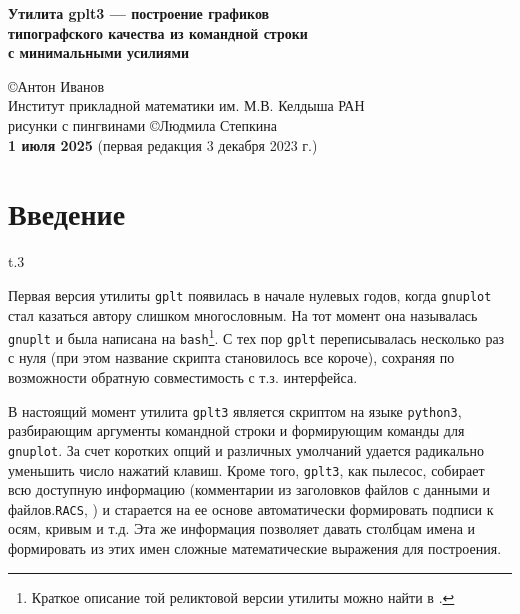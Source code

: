 \documentclass[12pt]{article}
\def\gplt{{\tt gplt}}
\def\gnuplot{{\tt gnuplot}}
\def\python{{\tt python3}}
\def\RACS{{\tt RACS}}
\begin{document}
\begin{center}
 { \Large\bf
Утилита gplt3 --- построение графиков\\ типографского качества из командной строки\\ с минимальными усилиями\\[5mm]
}

\large
\copyright Антон Иванов\\[2mm] 
\normalsize
Институт прикладной математики им. М.В. Келдыша РАН\\[2mm]

\small рисунки с пингвинами \copyright Людмила Степкина\\[3mm]
{\bf 1 июля 2025} (первая редакция 3 декабря 2023 г.)\\[7mm]

\end{center}

\vspace{-2cm}

\tableofcontents

\newpage
\section{Введение}
\begin{wrapfigure}[5]{t}{.3\textwidth}
  \vphantom{.}
  \vspace{-1.5cm}

\end{wrapfigure}
Первая версия утилиты \gplt{} появилась в начале нулевых годов, когда \gnuplot{} стал казаться автору слишком многословным.
На тот момент она называлась \verb'gnuplt' и была написана на \verb'bash'\footnote{Краткое описание той реликтовой версии утилиты можно найти в \cite{aiv:racs2007}.}.
С тех пор \gplt{} переписывалась несколько раз с нуля (при этом название скрипта становилось все короче),
сохраняя по возможности обратную совместимость с т.з. интерфейса.  

\def\gplt{{\tt gplt3}}

В настоящий момент утилита \gplt{} является скриптом на языке \python, разбирающим аргументы командной строки и формирующим команды для \gnuplot.
За счет коротких опций и различных умолчаний удается радикально уменьшить число нажатий клавиш. Кроме того, \gplt{}, как пылесос, собирает всю доступную информацию
(комментарии из заголовков файлов с данными и файлов.\RACS, \cite{aiwlib:SR:PP2018})
и старается на ее основе автоматически формировать подписи к осям, кривым и т.д.
Эта же информация позволяет давать столбцам имена и формировать из этих имен сложные математические выражения для построения.
\end{document}
